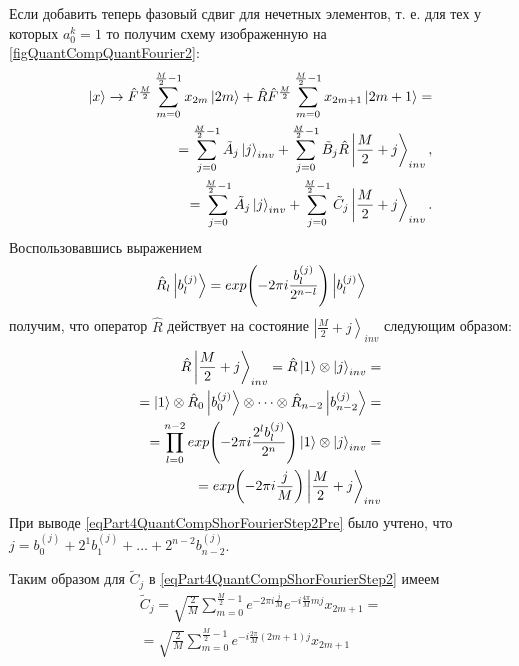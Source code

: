 

Если добавить теперь фазовый сдвиг для нечетных элементов, т. е. для
тех у которых $a_0^k = 1$ то получим схему изображенную на
\autoref{figQuantCompQuantFourier2}: 
\begin{eqnarray}
\ket{x} \rightarrow
\hat{F}^{\frac{M}{2}} \sum_{m = 0}^{\frac{M}{2} - 1}x_{2m} \ket{2m} +
\hat{R}\hat{F}^{\frac{M}{2}} \sum_{m = 0}^{\frac{M}{2} - 1} x_{2m + 1}
\ket{2m+1} =
\nonumber \\
= 
\sum^{\frac{M}{2} - 1}_{j = 0} \tilde{A}_{j} \ket{j}_{inv} +
\sum^{\frac{M}{2} - 1}_{j = 0}  
\tilde{B}_{j} \hat{R}\left|\frac{M}{2} + j\right>_{inv},
\nonumber \\
= 
\sum^{\frac{M}{2} - 1}_{j = 0}  \tilde{A}_{j} \ket{j}_{inv} +
\sum^{\frac{M}{2} - 1}_{j = 0}  
\tilde{C}_{j} \left|\frac{M}{2} + j\right>_{inv}.
\label{eqPart4QuantCompShorFourierStep2}
\end{eqnarray}
Воспользовавшись выражением
\begin{equation}
\hat{R}_l \ket{b^{(j)}_l} = 
exp{\left(- 2 \pi i \frac{b^{(j)}_l}{2^{n-l}}\right)}
\ket{b^{(j)}_l}
\nonumber
\end{equation}
получим, что оператор $\hat{R}$ действует на состояние 
$\left|\frac{M}{2} + j\right>_{inv}$ следующим образом:
\begin{eqnarray}
\hat{R}\left|\frac{M}{2} + j\right>_{inv} = 
\hat{R}\ket{1} \otimes  \ket{j}_{inv} = 
\nonumber \\
= 
\ket{1} \otimes \hat{R}_0 \ket{b^{(j)}_0}
\otimes \cdots \otimes \hat{R}_{n-2} \ket{b^{(j)}_{n-2}} = 
\nonumber \\
= 
\prod_{l = 0}^{n-2}exp{\left(- 2 \pi i \frac{2^lb^{(j)}_l}{2^n}\right)}
\ket{1} \otimes \ket{j}_{inv} = 
\nonumber \\
=
exp{\left(-2 \pi i \frac{j}{M}\right)}
\left|\frac{M}{2} + j\right>_{inv} 
\label{eqPart4QuantCompShorFourierStep2Pre}
\end{eqnarray}
При выводе \eqref{eqPart4QuantCompShorFourierStep2Pre} было учтено,
что $j = b^{(j)}_0 + 2^1 b^{(j)}_1 + \dots + 2^{n-2} b^{(j)}_{n-2}$. 

Таким образом для $\tilde{C}_{j}$ в 
\eqref{eqPart4QuantCompShorFourierStep2} имеем
\begin{eqnarray}
\tilde{C}_{j} = 
\sqrt{\frac{2}{M}} 
\sum_{m = 0}^{\frac{M}{2} - 1} 
e^{- 2 \pi i \frac{j}{M}}
e^{-i \frac{4 \pi}{M} m j} x_{2m+1} =
\nonumber \\
=
\sqrt{\frac{2}{M}} 
\sum_{m = 0}^{\frac{M}{2} - 1} 
e^{-i \frac{2 \pi}{M} \left(2m+1\right) j} x_{2m+1}
\label{eqPart4QuantCompShorC}
\end{eqnarray}

